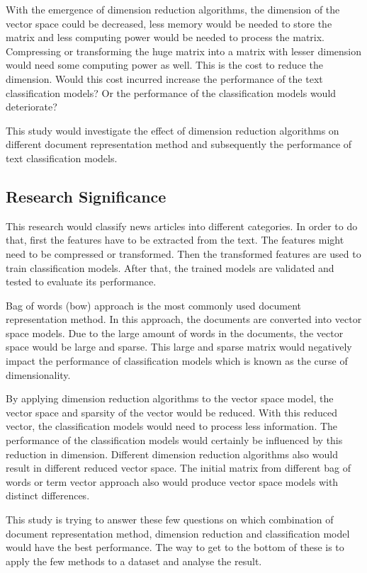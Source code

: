 With the emergence of dimension reduction algorithms, the dimension of the vector space could be decreased, less memory would be needed to store the matrix and less computing power would be needed to process the matrix. Compressing or transforming the huge matrix into a matrix with lesser dimension would need some computing power as well. This is the cost to reduce the dimension. Would this cost incurred increase the performance of the text classification models? Or the performance of the classification models would deteriorate?

This study would investigate the effect of dimension reduction algorithms on different document representation method and subsequently the performance of text classification models.\\

\subsection{Research Significance}
This research would classify news articles into different categories. In order to do that, first the features have to be extracted from the text. The features might need to be compressed or transformed. Then the transformed features are used to train classification models. After that, the trained models are validated and tested to evaluate its performance.

Bag of words (\ac{bow}) approach is the most commonly used document representation method. In this approach, the documents are converted into vector space models. Due to the large amount of words in the documents, the vector space would be large and sparse. This large and sparse matrix would negatively impact the performance of classification models which is known as the curse of dimensionality.

By applying dimension reduction algorithms to the vector space model, the vector space and sparsity of the vector would be reduced. With this reduced vector, the classification models would need to process less information. The performance of the classification models would certainly be influenced by this reduction in dimension. Different dimension reduction algorithms also would result in different reduced vector space. The initial matrix from different bag of words or term vector approach also would produce vector space models with distinct differences.

This study is trying to answer these few questions on which combination of document representation method, dimension reduction and classification model would have the best performance. The way to get to the bottom of these is to apply the few methods to a dataset and analyse the result.\\


